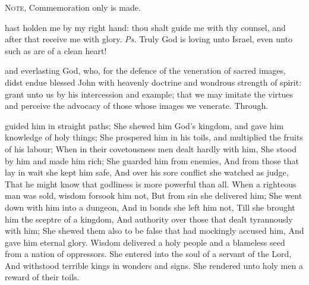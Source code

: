 
\begin{rubric}
	\textsc{Note,} Commemoration only is made.
\end{rubric}

\introit
{} hast holden me by my right hand: thou shalt guide me with thy counsel, and after that receive me with glory. \textit{Ps.} Truly God is loving unto Israel, even unto such as are of a clean heart!

\collect
{} and everlasting God, who, for the defence of the veneration of sacred images, didst endue blessed John with heavenly doctrine and wondrous strength of spirit: grant unto us by his intercession and example; that we may imitate the virtues and perceive the advocacy of those whose images we venerate. Through.

 guided him in straight paths; She shewed him God’s kingdom, and gave him knowledge of holy things; She prospered him in his toils, and multiplied the fruits of his labour; When in their covetousness men dealt hardly with him, She stood by him and made him rich; She guarded him from enemies, And from those that lay in wait she kept him safe, And over his sore conflict she watched as judge, That he might know that godliness is more powerful than all. When a righteous man was sold, wisdom forsook him not, But from sin she delivered him; She went down with him into a dungeon, And in bonds she left him not, Till she brought him the sceptre of a kingdom, And authority over those that dealt tyrannously with him; She shewed them also to be false that had mockingly accused him, And gave him eternal glory. Wisdom delivered a holy people and a blameless seed from a nation of oppressors. She entered into the soul of a servant of the Lord, And withstood terrible kings in wonders and signs. She rendered unto holy men a reward of their toils.


